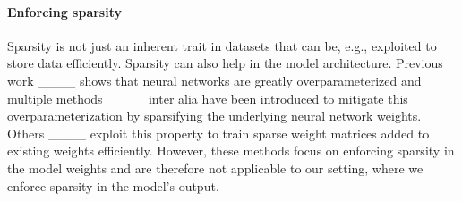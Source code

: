 \paragraph{Enforcing sparsity} Sparsity is not just an inherent trait in datasets that can be, e.g., exploited to store data efficiently. Sparsity can also help in the model architecture. Previous work ____ shows that neural networks are greatly overparameterized and multiple methods ____ inter alia have been introduced to mitigate this overparameterization by sparsifying the underlying neural network weights. Others ____ exploit this property to train sparse weight matrices added to existing weights efficiently. However, these methods focus on enforcing sparsity in the model weights and are therefore not applicable to our setting, where we enforce sparsity in the model's output.